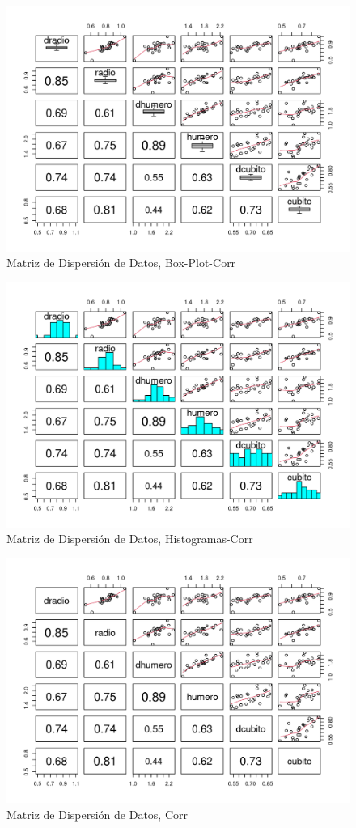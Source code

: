 \documentclass[12pt,a4paper,]{book}
\numberwithin{dummy}{section}
\theoremstyle{ocrenumbox}
\theoremstyle{ocrenumbox}
\theoremstyle{ocrenumbox}
\theoremstyle{ocrenumbox}
\theoremstyle{ocrenum}
\begin{document}
\begin{figure}[H]

{\centering \includegraphics[width=0.7\linewidth]{figurasR/grafica1f-1} 

}

\caption{Matriz de Dispersión de Datos, Box-Plot-Corr}\label{fig:grafica1f}
\end{figure}

\begin{figure}[H]

{\centering \includegraphics[width=0.7\linewidth]{figurasR/grafica1g-1} 

}

\caption{Matriz de Dispersión de Datos, Histogramas-Corr}\label{fig:grafica1g}
\end{figure}

\begin{figure}[H]

{\centering \includegraphics[width=0.7\linewidth]{figurasR/grafica1h-1} 

}

\caption{Matriz de Dispersión de Datos, Corr}\label{fig:grafica1h}
\end{figure}
\end{document}
